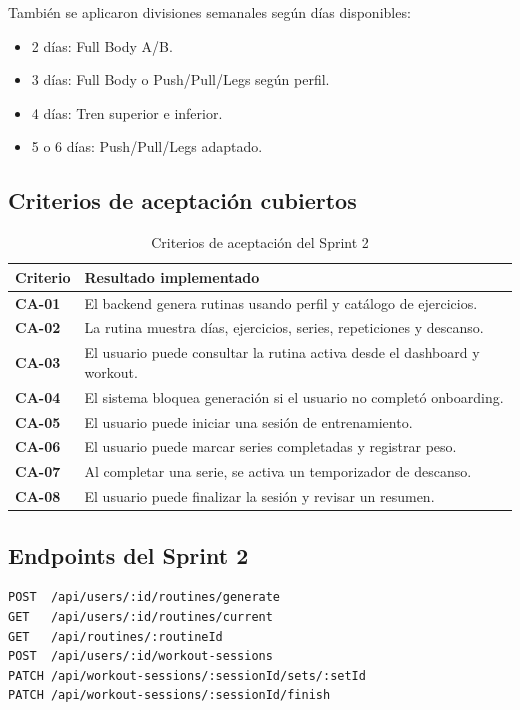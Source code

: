 \documentclass[12pt,a4paper]{article}
\begin{document}
También se aplicaron divisiones semanales según días disponibles:

\begin{itemize}
    \item 2 días: Full Body A/B.
    \item 3 días: Full Body o Push/Pull/Legs según perfil.
    \item 4 días: Tren superior e inferior.
    \item 5 o 6 días: Push/Pull/Legs adaptado.
\end{itemize}

\subsection{Criterios de aceptación cubiertos}

\begin{table}[H]
\centering
\caption{Criterios de aceptación del Sprint 2}
\renewcommand{\arraystretch}{1.3}
\begin{tabularx}{\textwidth}{>{\bfseries}p{3cm} X}
\toprule
Criterio & Resultado implementado \\
\midrule
CA-01 & El backend genera rutinas usando perfil y catálogo de ejercicios. \\
CA-02 & La rutina muestra días, ejercicios, series, repeticiones y descanso. \\
CA-03 & El usuario puede consultar la rutina activa desde el dashboard y workout. \\
CA-04 & El sistema bloquea generación si el usuario no completó onboarding. \\
CA-05 & El usuario puede iniciar una sesión de entrenamiento. \\
CA-06 & El usuario puede marcar series completadas y registrar peso. \\
CA-07 & Al completar una serie, se activa un temporizador de descanso. \\
CA-08 & El usuario puede finalizar la sesión y revisar un resumen. \\
\bottomrule
\end{tabularx}
\end{table}

\subsection{Endpoints del Sprint 2}

\begin{lstlisting}
POST  /api/users/:id/routines/generate
GET   /api/users/:id/routines/current
GET   /api/routines/:routineId
POST  /api/users/:id/workout-sessions
PATCH /api/workout-sessions/:sessionId/sets/:setId
PATCH /api/workout-sessions/:sessionId/finish
\end{lstlisting}
\end{document}
